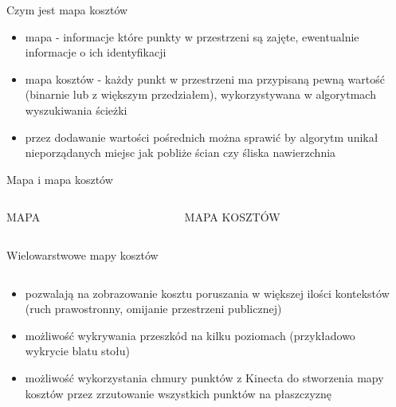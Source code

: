 
\begin{frame}{Czym jest mapa kosztów}
	\begin{itemize}
		\item mapa - informacje które punkty w przestrzeni są zajęte, ewentualnie informacje o ich identyfikacji
		\item mapa kosztów - każdy punkt w przestrzeni ma przypisaną pewną wartość (binarnie lub z większym przedziałem), wykorzystywana w algorytmach wyszukiwania ścieżki
		\item przez dodawanie wartości pośrednich można sprawić by algorytm unikał nieporządanych miejsc jak pobliże ścian czy śliska nawierzchnia
	\end{itemize}
\end{frame}

\begin{frame}{Mapa i mapa kosztów}
\begin{columns}
		\begin{column}{0.5\textwidth}
			\begin{center}
				MAPA
			\end{center}
		\end{column}
		\begin{column}{0.5\textwidth}  %
			\begin{center}
				MAPA KOSZTÓW
			\end{center}
		\end{column}
	\end{columns}
\end{frame}

\begin{frame}
{Wielowarstwowe mapy kosztów}
\begin{columns}
		\begin{column}{0.5\textwidth}
			\begin{itemize}
				\item pozwalają na zobrazowanie kosztu poruszania w większej ilości kontekstów (ruch prawostronny, omijanie przestrzeni publicznej)
				\item możliwość wykrywania przeszkód na kilku poziomach (przykładowo wykrycie blatu stołu)
				\item możliwość wykorzystania chmury punktów z Kinecta do stworzenia mapy kosztów przez zrzutowanie wszystkich punktów na płaszczyznę
			\end{itemize}
		\end{column}
		\begin{column}{0.5\textwidth}  %
		\end{column}
	\end{columns}
\end{frame}

